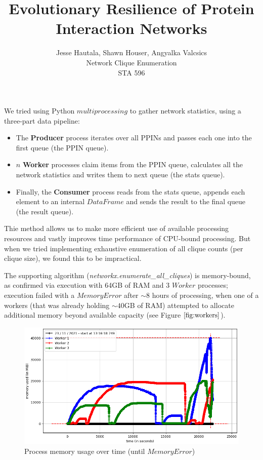 \documentclass[12pt]{article}
\title{\textbf{Evolutionary Resilience of Protein Interaction Networks}}
\author{Jesse Hautala, Shawn Houser, Angyalka Valcsics \\ Network Clique Enumeration \\ STA 596}
\begin{document}
\maketitle

We tried using Python $multiprocessing$ to gather network statistics, using a three-part data pipeline:
\begin{itemize}
    \item The \textbf{Producer} process iterates over all PPINs and passes each one into the first queue (the PPIN queue).
    \item $n$ \textbf{Worker} processes claim items from the PPIN queue, calculates all the network statistics and writes them to next queue (the stats queue).
    \item Finally, the \textbf{Consumer} process reads from the stats queue, appends each element to an internal $DataFrame$ and sends the result to the final queue (the result queue).
\end{itemize}

Thie method allows us to make more efficient use of available processing resources and vastly improves time performance of CPU-bound processing. But when we tried implementing exhaustive enumeration of all clique counts (per clique size), we found this to be impractical.

The supporting algorithm (\textit{networkx.enumerate\_all\_cliques}) is memory-bound, as confirmed via execution with 64GB of RAM and 3 $Worker$ processes; execution failed with a $MemoryError$ after $\sim8$ hours of processing, when one of a workers (that was already holding $\sim40$GB of RAM) attempted to allocate additional memory beyond available capacity (see Figure $\ref{fig:workers}$).

\begin{figure}[!htbp]
    \centering
    \includegraphics[scale=.5]{workers}
    \caption{Process memory usage over time (until $MemoryError$)}
    \label{fig:workers}
\end{figure}
\end{document}
